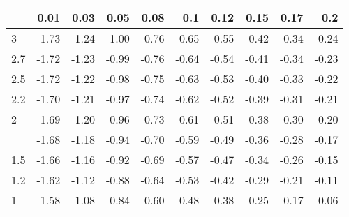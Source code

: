 
\begin{tabular}{lrrrrrrrrr}
\toprule
  & 0.01 & 0.03 & 0.05 & 0.08 & 0.1 & 0.12 & 0.15 & 0.17 & 0.2\\
\midrule
3 & -1.73 & -1.24 & -1.00 & -0.76 & -0.65 & -0.55 & -0.42 & -0.34 & -0.24\\
2.7 & -1.72 & -1.23 & -0.99 & -0.76 & -0.64 & -0.54 & -0.41 & -0.34 & -0.23\\
2.5 & -1.72 & -1.22 & -0.98 & -0.75 & -0.63 & -0.53 & -0.40 & -0.33 & -0.22\\
2.2 & -1.70 & -1.21 & -0.97 & -0.74 & -0.62 & -0.52 & -0.39 & -0.31 & -0.21\\
2 & -1.69 & -1.20 & -0.96 & -0.73 & -0.61 & -0.51 & -0.38 & -0.30 & -0.20\\
\addlinespace
1.7 & -1.68 & -1.18 & -0.94 & -0.70 & -0.59 & -0.49 & -0.36 & -0.28 & -0.17\\
1.5 & -1.66 & -1.16 & -0.92 & -0.69 & -0.57 & -0.47 & -0.34 & -0.26 & -0.15\\
1.2 & -1.62 & -1.12 & -0.88 & -0.64 & -0.53 & -0.42 & -0.29 & -0.21 & -0.11\\
1 & -1.58 & -1.08 & -0.84 & -0.60 & -0.48 & -0.38 & -0.25 & -0.17 & -0.06\\
\bottomrule
\end{tabular}

